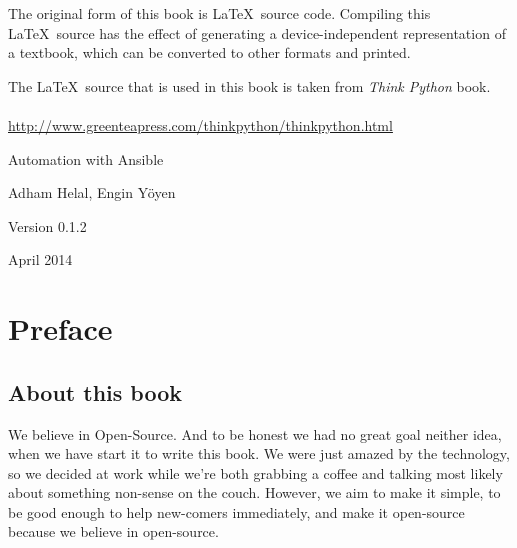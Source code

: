 \documentclass[10pt]{book}
\newcommand{\thetitle}{Automation with Ansible}
\newcommand{\theversion}{0.1.2}
\newcommand{\thedate}{April 2014}
\begin{document}
\begin{latexonly}
{The original form of this book is \LaTeX\ source code.  Compiling this
\LaTeX\ source has the effect of generating a device-independent
representation of a textbook, which can be converted to other formats
and printed. 

The \LaTeX\ source that is used in this book is taken from \emph{Think Python} book.
\\
\\
\url{http://www.greenteapress.com/thinkpython/thinkpython.html}




\vspace{0.2in}

} %

\end{latexonly}



\begin{htmlonly}


{\Large \thetitle}

{\large Adham Helal, Engin Yöyen}

Version \theversion

\thedate

\setcounter{chapter}{-1}

\end{htmlonly}

\fi



\chapter{Preface}

\section*{About this book}
We believe in Open-Source. And to be honest we had no great goal neither idea, when we have start it 
to write this book. We were just amazed by the technology, so we decided at work 
while we're both grabbing a coffee and talking most likely about something 
non-sense on the couch. However, we aim to make it simple, to be good enough to 
help new-comers immediately, and make it open-source because we believe in open-source.
\end{document}
